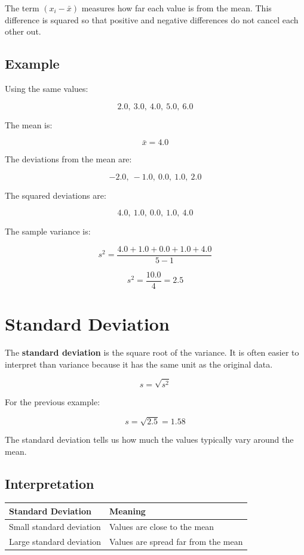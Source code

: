 \documentclass[11pt]{report}
\newenvironment{Important note}{\begin{quote}\color{red}\textbf{Important note:} }{\end{quote}}
\begin{document}
The term $(x_i - \bar{x})$ measures how far each value is from the mean. This difference is squared so that positive and negative differences do not cancel each other out.

\subsection*{Example}

Using the same values:

\[
2.0,\ 3.0,\ 4.0,\ 5.0,\ 6.0
\]

The mean is:

\[
\bar{x} = 4.0
\]

The deviations from the mean are:

\[
-2.0,\ -1.0,\ 0.0,\ 1.0,\ 2.0
\]

The squared deviations are:

\[
4.0,\ 1.0,\ 0.0,\ 1.0,\ 4.0
\]

The sample variance is:

\[
s^2 = \frac{4.0 + 1.0 + 0.0 + 1.0 + 4.0}{5-1}
\]

\[
s^2 = \frac{10.0}{4} = 2.5
\]

\section{Standard Deviation}

The \textbf{standard deviation} is the square root of the variance. It is often easier to interpret than variance because it has the same unit as the original data.

\[
s = \sqrt{s^2}
\]

For the previous example:

\[
s = \sqrt{2.5} = 1.58
\]

The standard deviation tells us how much the values typically vary around the mean.

\subsection*{Interpretation}

\begin{center}
\begin{tabular}{ll}
\toprule
\textbf{Standard Deviation} & \textbf{Meaning} \\
\midrule
Small standard deviation & Values are close to the mean \\
Large standard deviation & Values are spread far from the mean \\
\bottomrule
\end{tabular}
\end{center}
\end{document}
